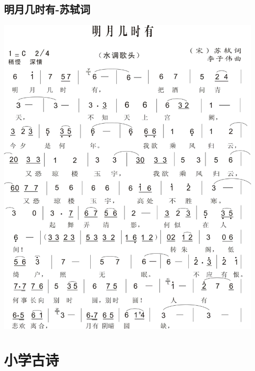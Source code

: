 \documentclass[cn,pad,chinesefont=nofont]{elegantbook}
\begin{document}
\section{明月几时有-苏轼词}
    \includegraphics[width=\textwidth]{dongxiao/20200411-明月几时有.jpg}
    
\chapter{小学古诗}
\end{document}
